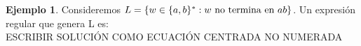 \documentclass[fleqn, 10pt]{article}
\theoremstyle{plain}
\theoremstyle{definition}
\newtheorem{example}{Ejemplo}[section]
\begin{document}
\begin{example}
Consideremos $L=\{w\in \{a,b\}^* : w \textnormal{ no termina en } ab\}$. Un expresión regular que genera L es: \\
ESCRIBIR SOLUCIÓN COMO ECUACIÓN CENTRADA NO NUMERADA

\end{example}
\end{document}
